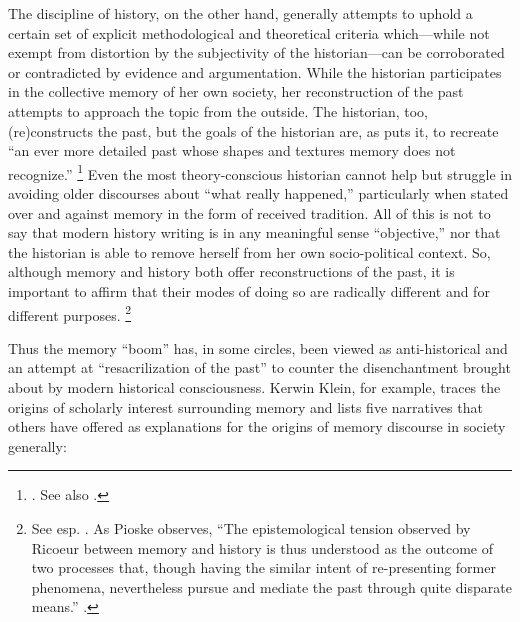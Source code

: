 The discipline of history, on the other hand, generally attempts to uphold a certain set of explicit methodological and theoretical criteria which---while not exempt from distortion by the subjectivity of the historian---can be corroborated or contradicted by evidence and argumentation.%
    \autocite[12--13]{pioske_bibint2015}
While the historian participates in the collective memory of her own society, her reconstruction of the past attempts to approach the topic from the outside. The historian, too, (re)constructs the past, but the goals of the historian are, as \yerushalmi puts it, to recreate ``an ever more detailed past whose shapes and textures memory does not recognize.''%
    \footnote{%
        \Cite[94]{yerushalmi1989}. See also
        \cite[532]{verovsek_pgi2016}.}
Even the most theory-conscious historian cannot help but struggle in avoiding older discourses about ``what really happened,'' particularly when stated over and against memory in the form of received tradition. All of this is not to say that modern history writing is in any meaningful sense ``objective,'' nor that the historian is able to remove herself from her own socio-political context. So, although memory and history both offer reconstructions of the past, it is important to affirm that their modes of doing so are radically different and for different purposes.%
    \footnote{See esp. 
        \cite[497]{ricoeur2004}. As Pioske observes, ``The epistemological tension observed by Ricoeur between memory and history is thus understood as the outcome of two processes that, though having the similar intent of re-presenting former phenomena, nevertheless pursue and mediate the past through quite disparate means.''
        \cite[12]{pioske_bibint2015}.}

Thus the memory ``boom'' has, in some circles, been viewed as anti-historical and an attempt at ``resacrilization of the past'' to counter the disenchantment brought about by modern historical consciousness.%
    \autocite[282]{winter2006}
Kerwin Klein, for example, traces the origins of scholarly interest surrounding memory and lists five narratives that others have offered as explanations for the origins of memory discourse in society generally:  

